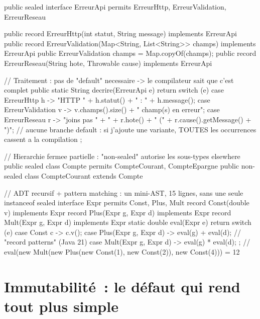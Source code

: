 \documentclass[12pt,a4paper,twoside,openright]{book}
\begin{document}
\begin{codejava}
public sealed interface ErreurApi permits ErreurHttp, ErreurValidation, ErreurReseau { }

public record ErreurHttp(int statut, String message) implements ErreurApi { }
public record ErreurValidation(Map<String, List<String>> champs) implements ErreurApi {
    public ErreurValidation { champs = Map.copyOf(champs); }
}
public record ErreurReseau(String hote, Throwable cause) implements ErreurApi { }

// Traitement : pas de "default" necessaire -> le compilateur sait que c'est complet
public static String decrire(ErreurApi e) {
    return switch (e) {
        case ErreurHttp h -> "HTTP " + h.statut() + " : " + h.message();
        case ErreurValidation v -> v.champs().size() + " champ(s) en erreur";
        case ErreurReseau r -> "joins pas " + " + r.hote() + " (" + r.cause().getMessage() + ")";
        // aucune branche default : si j'ajoute une variante, TOUTES les occurrences cassent a la compilation
    };
}

// Hierarchie fermee partielle : "non-sealed" autorise les sous-types elsewhere
public sealed class Compte permits CompteCourant, CompteEpargne { }
public non-sealed class CompteCourant extends Compte { }

// ADT recursif + pattern matching : un mini-AST, 15 lignes, sans une seule instanceof
sealed interface Expr permits Const, Plus, Mult { }
record Const(double v) implements Expr { }
record Plus(Expr g, Expr d) implements Expr { }
record Mult(Expr g, Expr d) implements Expr { }
static double eval(Expr e) {
    return switch (e) {
        case Const c -> c.v();
        case Plus(Expr g, Expr d) -> eval(g) + eval(d);       // "record patterns" (Java 21)
        case Mult(Expr g, Expr d) -> eval(g) * eval(d);
    };
}
// eval(new Mult(new Plus(new Const(1), new Const(2)), new Const(4))) = 12
\end{codejava}

\section{Immutabilit\'e~: le d\'efaut qui rend tout plus simple}
\end{document}
